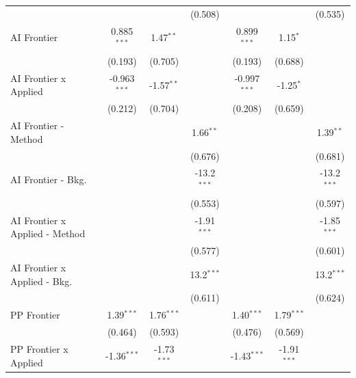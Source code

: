 \begin{tabular}{lcccccc}
                                  &                &                & (0.508)       &                &               & (0.535)\\   
   AI Frontier                    & 0.885$^{***}$  & 1.47$^{**}$    &               & 0.899$^{***}$  & 1.15$^{*}$    &   \\   
                                  & (0.193)        & (0.705)        &               & (0.193)        & (0.688)       &   \\   
   AI Frontier x Applied          & -0.963$^{***}$ & -1.57$^{**}$   &               & -0.997$^{***}$ & -1.25$^{*}$   &   \\   
                                  & (0.212)        & (0.704)        &               & (0.208)        & (0.659)       &   \\   
   AI Frontier - Method           &                &                & 1.66$^{**}$   &                &               & 1.39$^{**}$\\   
                                  &                &                & (0.676)       &                &               & (0.681)\\   
   AI Frontier - Bkg.             &                &                & -13.2$^{***}$ &                &               & -13.2$^{***}$\\   
                                  &                &                & (0.553)       &                &               & (0.597)\\   
   AI Frontier x Applied - Method &                &                & -1.91$^{***}$ &                &               & -1.85$^{***}$\\   
                                  &                &                & (0.577)       &                &               & (0.601)\\   
   AI Frontier x Applied - Bkg.   &                &                & 13.2$^{***}$  &                &               & 13.2$^{***}$\\   
                                  &                &                & (0.611)       &                &               & (0.624)\\   
   PP Frontier                    & 1.39$^{***}$   & 1.76$^{***}$   &               & 1.40$^{***}$   & 1.79$^{***}$  &   \\   
                                  & (0.464)        & (0.593)        &               & (0.476)        & (0.569)       &   \\   
   PP Frontier x Applied          & -1.36$^{***}$  & -1.73$^{***}$  &               & -1.43$^{***}$  & -1.91$^{***}$ &   \\   

\end{tabular}

